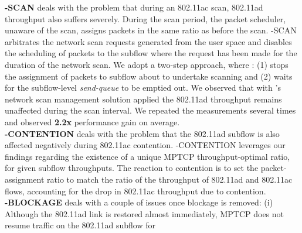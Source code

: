 \noindent\textbf{\name-SCAN} 
deals with the problem that during an 802.11ac scan, 802.11ad throughput also suffers severely.
During the scan period, the packet
scheduler, unaware of the scan, assigns packets in the same ratio as before the scan.
\name-SCAN
arbitrates the network scan requests generated
from the user space and disables the scheduling of packets to the
subflow where the request has been made for the duration of the
network scan. 
We
adopt a two-step approach, where \name: (1) stops the assignment of
packets to subflow about to undertake scanning and (2) waits for the
subflow-level \emph{send-queue} to be emptied out. We observed that
with \name's network scan management solution applied 
the 802.11ad throughput remains unaffected during the scan interval. 
\fi
We repeated the
measurements several times and observed \textbf{2.2x} performance gain on average.
\\
\noindent\textbf{\name-CONTENTION} deals with the problem that
the 802.11ad subflow is also
affected negatively during 802.11ac contention.
\name-CONTENTION leverages our findings regarding the 
existence of a unique MPTCP throughput-optimal ratio, for given subflow
throughputs. The reaction to contention is to set
the packet-assignment ratio to match the ratio of the throughput of
802.11ad and 802.11ac flows, accounting for the drop in 802.11ac
throughput due to contention. 
\\
\noindent\textbf{\name-BLOCKAGE} deals with a couple of issues once blockage is removed:
\noindent(i) Although the 802.11ad link is restored 
almost immediately, 
MPTCP does not resume traffic on the 802.11ad subflow for
